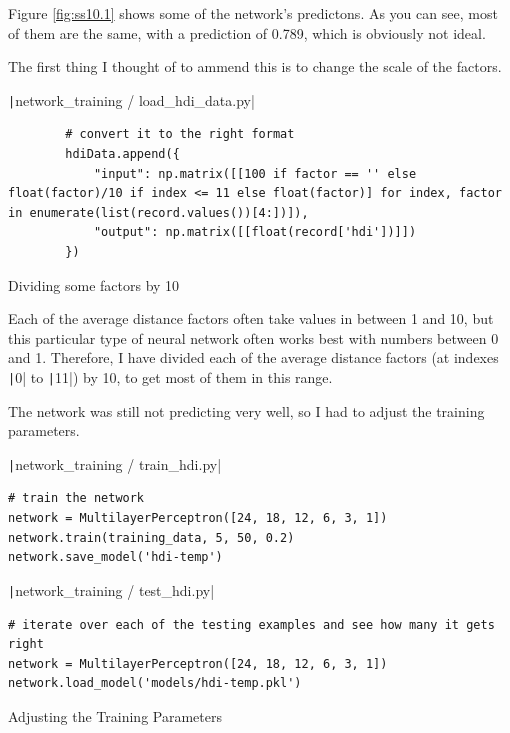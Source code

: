 \documentclass[12pt]{report}
\newcommand{\pil}[1]{\protect\texttt|#1|}
\begin{document}
Figure \ref{fig:ss10.1} shows some of the network's predictons. As you can see, most of them are the same, with a prediction of 0.789, which is obviously not ideal.

The first thing I thought of to ammend this is to change the scale of the factors.

\begin{listing}[H]
\pil{network_training / load_hdi_data.py}
\begin{verbatim}
        # convert it to the right format
        hdiData.append({
            "input": np.matrix([[100 if factor == '' else float(factor)/10 if index <= 11 else float(factor)] for index, factor in enumerate(list(record.values())[4:])]),
            "output": np.matrix([[float(record['hdi'])]])
        })
\end{verbatim}
\caption{Dividing some factors by 10}\label{cs:divFactorsBy10}
\end{listing}

Each of the average distance factors often take values in between 1 and 10, but this particular type of neural network often works best with numbers between 0 and 1. Therefore, I have divided each of the average distance factors (at indexes \pil{0} to \pil{11}) by 10, to get most of them in this range.

\begin{center}
\end{center}

The network was still not predicting very well, so I had to adjust the training parameters.

\begin{listing}[H]
\pil{network_training / train_hdi.py}
\begin{verbatim}
# train the network
network = MultilayerPerceptron([24, 18, 12, 6, 3, 1])
network.train(training_data, 5, 50, 0.2)
network.save_model('hdi-temp')
\end{verbatim}
\pil{network_training / test_hdi.py}
\begin{verbatim}
# iterate over each of the testing examples and see how many it gets right
network = MultilayerPerceptron([24, 18, 12, 6, 3, 1])
network.load_model('models/hdi-temp.pkl')
\end{verbatim}
\caption{Adjusting the Training Parameters}\label{cs:adjustParameters}
\end{listing}
\end{document}
